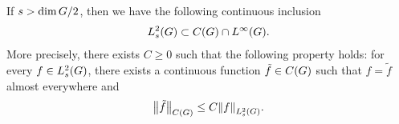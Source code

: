 \begin{proposition}
\label{proposition:Sobolev_embedding}
    If $s > \dim \Group / 2$, then we have the following continuous inclusion
    \begin{align*}
        \Sobolev{s} \subset \ContinuousFunctions\Group \cap \Lebesgue{\infty}{\Group}.
    \end{align*}
    More precisely, there exists $C \geq 0$ such that the following property holds:
    for every $f \in \Sobolev{s}$,
    there exists a continuous function $\tilde{f} \in \ContinuousFunctions\Group$ such that $f = \tilde{f}$ almost everywhere and
    \begin{align*}
        \norm[\ContinuousFunctions\Group]{\tilde{f}} \leq C \norm[\Sobolev{s}]{f}.
    \end{align*}
\end{proposition}
